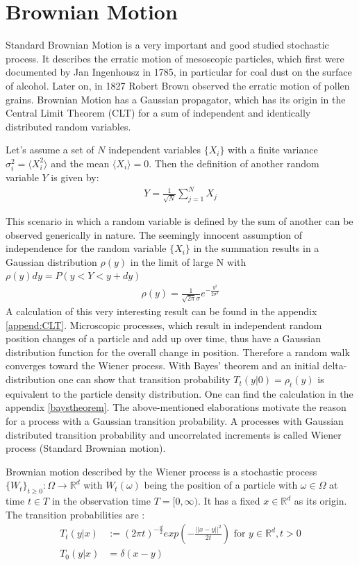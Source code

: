 \documentclass[
  a4paper,BCOR10mm,oneside,
  bibtotoc,idxtotoc,
  headsepline,footsepline,%
  fleqn,openbib
]{scrbook}
\begin{document}
\section{Brownian Motion}
Standard Brownian Motion is a very important and good studied stochastic process. It describes the erratic motion of mesoscopic particles, which first were documented by Jan Ingenhousz in 1785, in particular for coal dust on the surface of alcohol\cite{Hofling2013}. Later on, in 1827 Robert Brown observed the erratic motion of pollen grains. Brownian Motion has a Gaussian propagator, which has its origin in the Central Limit Theorem (CLT) for a sum of independent and identically distributed random variables.
\begin{mydef} 
Let's assume a set of $N$ independent variables $\{X_i\}$ with a finite variance $ \sigma_i^2=\langle X_{i}^2\rangle $ and the mean $\langle X_{i}\rangle = 0$. Then the definition of another random variable $Y$ is given by:
 \begin{align}
  Y = \frac{1}{\sqrt{N}} \sum_{j=1}^N X_j \label{eq:CLT}
 \end{align}
\end{mydef}
This scenario in which a random variable is defined by the sum of another can be observed generically in nature. The seemingly innocent assumption of independence for the random variable $\{X_i\}$ in the summation results in a Gaussian distribution $\rho(y)$ in the limit of large N with $\rho(y)dy=P(y<Y<y+dy)$ 
\begin{align}
 \rho(y) =\frac{1}{\sqrt{2 \pi} \sigma } e^{-\frac{y^2}{2 \sigma^2}}
\end{align}
A calculation of this very interesting result can be found in the appendix \ref{append:CLT}.    Microscopic processes, which result in independent random position changes of a particle and add up over time, thus have a Gaussian distribution function for the overall change in position. Therefore a random walk converges toward the Wiener process. \newline With  Bayes' theorem and an initial delta-distribution one can show that transition probability $T_{t}(y|0) = \rho_{t}(y)$ is equivalent to the particle density distribution. One can find the calculation in the appendix \ref{baystheorem}. The above-mentioned elaborations motivate the reason for a process with a Gaussian transition probability. A processes with Gaussian distributed transition probability and uncorrelated increments is called Wiener process (Standard Brownian motion).
\begin{mydef}
Brownian motion described by the Wiener process is a stochastic process $ \{ W_t \}_{t\geq0}: \Omega \rightarrow \mathbb{R}^d$ with $ W_t(\omega)$ being the position of a particle with $\omega \in \Omega$ at time $t \in T$ in the observation time $T =[0, \infty)$. It has a fixed $x \in \mathbb{R}^d$ as its origin. The transition probabilities are \cite{LectureFelix}: 
\begin{align}
T_{t}(y|x) & := (2 \pi t)^{- \frac{d}{2}} exp \left(- \frac{||x-y||^2}{2 t}\right) \text{ for } y \in \mathbb{R}^d, t>0 \\ \nonumber
T_{0}(y|x) & = \delta(x-y) 
\end{align}
\end{mydef}
\end{document}
